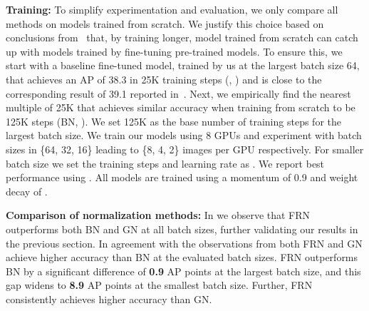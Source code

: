 \documentclass[10pt,twocolumn,letterpaper]{article}
\newcommand{\papername}{FRN}
\newcommand{\batchnorm}{BN}
\begin{document}
\medskip
\noindent
\textbf{Training:} To simplify experimentation and evaluation, we only compare all methods on models trained from scratch. We justify this choice based on conclusions from~\cite{he2019rethinking} that, by training longer, model trained from scratch can catch up with models trained by fine-tuning pre-trained models. To ensure this, we start with a baseline fine-tuned model, trained by us at the largest batch size 64, that achieves an AP of 38.3 in 25K training steps (, ) and is close to the corresponding result of 39.1 reported in~\cite{lin2017focal}. Next, we empirically find the nearest multiple of 25K that achieves similar accuracy when training from scratch to be 125K steps (BN, ). We set 125K as the base number of training steps for the largest batch size. We train our models using 8 GPUs and experiment with batch sizes in  \{64, 32, 16\} leading to \{8, 4, 2\} images per GPU  respectively. For smaller batch size  we set the training steps  and learning rate as . We report best performance using . All models are trained using a momentum of 0.9 and weight decay of .

\medskip
\noindent
\textbf{Comparison of normalization methods:} In  we observe that \papername{} outperforms both \batchnorm{} and GN at all batch sizes, further validating our results in the previous section. In agreement with the observations from  both \papername{} and GN achieve higher accuracy than \batchnorm{} at the evaluated batch sizes. \papername{} outperforms \batchnorm{} by a significant difference of \textbf{0.9} AP points at the largest batch size, and this gap widens to \textbf{8.9} AP points at the smallest batch size. Further, \papername{} consistently achieves higher accuracy than GN.
\end{document}
